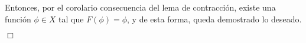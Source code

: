 Entonces, por el corolario consecuencia del lema de contracción, existe una función $\phi \in X$ tal que $F(\phi) = \phi$, y de esta forma, queda demostrado lo deseado.

\begin{flushright}
	$\Box$
\end{flushright}





